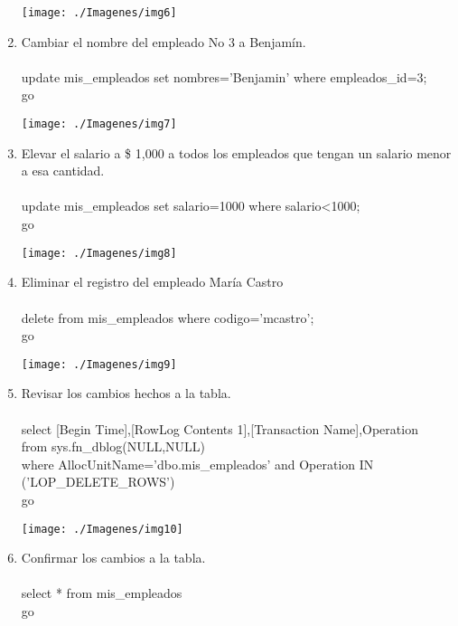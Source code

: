 \begin{enumerate}[1.]
	\begin{center}
	\texttt{[image: ./Imagenes/img6]} 
	\end{center}
	\item Cambiar el nombre del empleado No 3 a Benjamín.
	\\
	\\ update mis\_empleados set nombres='Benjamin' where empleados\_id=3;
	\\ go

	\begin{center}
	\texttt{[image: ./Imagenes/img7]} 
	\end{center}
	\item Elevar el salario a \$ 1,000 a todos los empleados que tengan un salario menor a esa cantidad.
	\\
	\\ update mis\_empleados set salario=1000 where salario<1000;
	\\ go

	\begin{center}
	\texttt{[image: ./Imagenes/img8]} 
	\end{center}
	\item Eliminar el registro del empleado María Castro
	\\
	\\ delete from mis\_empleados where codigo='mcastro';
	\\ go

	\begin{center}
	\texttt{[image: ./Imagenes/img9]} 
	\end{center}
	\item Revisar los cambios hechos a la tabla.
	\\
	\\ select [Begin Time],[RowLog Contents 1],[Transaction Name],Operation 
	\\from sys.fn\_dblog(NULL,NULL) 
	\\where AllocUnitName='dbo.mis\_empleados' and Operation IN ('LOP\_DELETE\_ROWS')
	\\ go

	\begin{center}
	\texttt{[image: ./Imagenes/img10]} 
	\end{center}
	\item Confirmar los cambios a la tabla.
	\\
	\\ select * from mis\_empleados
	\\ go


\end{enumerate}
